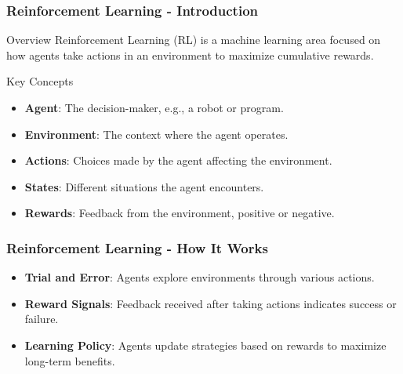 \documentclass[aspectratio=169]{beamer}
\begin{document}
\begin{frame}[fragile]
    \frametitle{Reinforcement Learning - Introduction}
    \begin{block}{Overview}
        Reinforcement Learning (RL) is a machine learning area focused on how agents take actions in an environment to maximize cumulative rewards.
    \end{block}
    
    \begin{block}{Key Concepts}
        \begin{itemize}
            \item \textbf{Agent}: The decision-maker, e.g., a robot or program.
            \item \textbf{Environment}: The context where the agent operates.
            \item \textbf{Actions}: Choices made by the agent affecting the environment.
            \item \textbf{States}: Different situations the agent encounters.
            \item \textbf{Rewards}: Feedback from the environment, positive or negative.
        \end{itemize}
    \end{block}
\end{frame}

\begin{frame}[fragile]
    \frametitle{Reinforcement Learning - How It Works}
    \begin{itemize}
        \item \textbf{Trial and Error}: Agents explore environments through various actions.
        \item \textbf{Reward Signals}: Feedback received after taking actions indicates success or failure.
        \item \textbf{Learning Policy}: Agents update strategies based on rewards to maximize long-term benefits.
    \end{itemize}
\end{frame}
\end{document}
